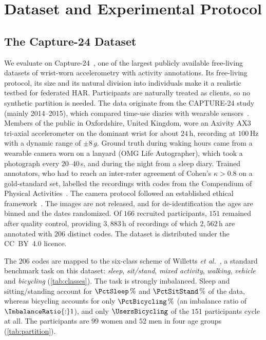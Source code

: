 \section{Dataset and Experimental Protocol}\label{sec:data}

\subsection{The Capture-24 Dataset}\label{sec:data:capture24}

We evaluate on Capture-24~\cite{chan2024capture24}, one of the largest publicly available
free-living datasets of wrist-worn accelerometry with activity annotations. Its free-living
protocol, its size and its natural division into individuals make it a realistic testbed for
federated HAR. Participants are naturally treated as clients, so no synthetic partition is
needed. The data originate from the CAPTURE-24 study (mainly 2014--2015), which compared
time-use diaries with wearable sensors~\cite{gershuny2020testing}. Members of the public in
Oxfordshire, United Kingdom, wore an Axivity AX3 tri-axial accelerometer on the dominant wrist for
about $24$\,h, recording at $100$\,Hz with a dynamic range of $\pm8\,g$. Ground truth during waking
hours came from a wearable camera worn on a lanyard (OMG Life Autographer), which took a
photograph every $20$--$40$\,s, and during the night from a sleep diary. Trained annotators, who had to
reach an inter-rater agreement of Cohen's $\kappa>0.8$ on a gold-standard set, labelled the
recordings with codes from the Compendium of Physical
Activities~\cite{ainsworth2011compendium}. The camera protocol followed an established ethical
framework~\cite{kelly2013ethical}. The images are not released, and for de-identification the ages
are binned and the dates randomized. Of $166$ recruited participants, $151$ remained after quality
control, providing $3{,}883$\,h of recordings of which $2{,}562$\,h are annotated with $206$ distinct
codes. The dataset is distributed under the CC~BY~4.0 licence.

The $206$ codes are mapped to the six-class scheme of Willetts \emph{et
al.}~\cite{willetts2018statistical}, a standard benchmark task on this dataset: \emph{sleep},
\emph{sit/stand}, \emph{mixed activity}, \emph{walking}, \emph{vehicle} and \emph{bicycling}
(\cref{tab:classes}). The task is strongly imbalanced. Sleep and sitting/standing account for
$\PctSleep\,\%$ and $\PctSitStand\,\%$ of the data, whereas bicycling accounts for only
$\PctBicycling\,\%$ (an imbalance ratio of $\ImbalanceRatio{:}1$), and only $\UsersBicycling$ of the
$151$ participants cycle at all. The participants are $99$ women and $52$ men in four age groups
(\cref{tab:partition}).


